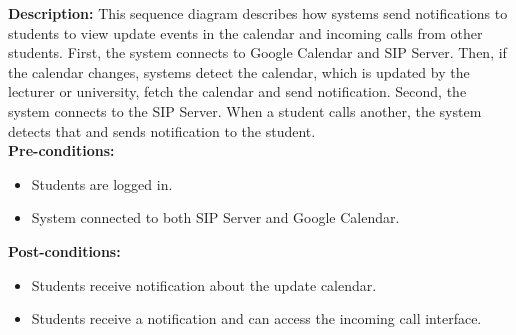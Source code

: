     \textbf{Description:} This sequence diagram describes how systems send notifications to students to view update events in the calendar and incoming calls from other students. 
    First, the system connects to Google Calendar and SIP Server. 
    Then, if the calendar changes, systems detect the calendar, which is updated by the lecturer or university, fetch the calendar and send notification. 
    Second, the system connects to the SIP Server. When a student calls another, the system detects that and sends notification to the student. \\

    \noindent \textbf{Pre-conditions:} 
        \begin{itemize}
            \item Students are logged in.
            \item System connected to both SIP Server and Google Calendar.
        \end{itemize}
    \noindent \textbf{Post-conditions:}
    \begin{itemize}
        \item Students receive notification about the update calendar.
        \item Students receive a notification and can access the incoming call interface.
    \end{itemize}
